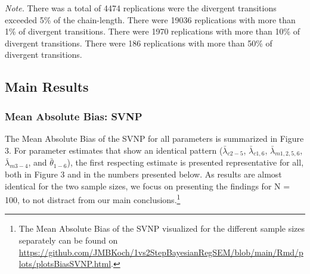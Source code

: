 \documentclass[
  english,
  man, donotrepeattitle,floatsintext]{apa6}
\begin{document}
\begin{table}[tbp]
\begin{center}
\begin{threeparttable}
\begin{tablenotes}[para]
\normalsize{\textit{Note.} There was a total of 4474 replications were the divergent transitions exceeded 5\% of the chain-length. There were 19036 replications with more than 1\% of divergent transitions. There were 1970 replications with more than 10\% of divergent transitions. There were 186 replications with more than 50\% of divergent transitions.}
\end{tablenotes}

\end{threeparttable}
\end{center}

\end{table}

\hypertarget{main-results}{%
\subsection{Main Results}\label{main-results}}

\hypertarget{mean-absolute-bias-svnp}{%
\subsubsection{Mean Absolute Bias: SVNP}\label{mean-absolute-bias-svnp}}

The Mean Absolute Bias of the SVNP for all parameters is summarized in Figure 3. For parameter estimates that show an identical pattern (\(\bar{\lambda}_{c 2-5}\), \(\bar{\lambda}_{c 1, 6}\), \(\bar{\lambda}_{m 1, 2, 5, 6}\), \(\bar{\lambda}_{m 3-4}\), and \(\bar{\theta}_{1-6}\)), the first respecting estimate is presented representative for all, both in Figure 3 and in the numbers presented below. As results are almost identical for the two sample sizes, we focus on presenting the findings for N = 100, to not distract from our main conclusions.\footnote{The Mean Absolute Bias of the SVNP visualized for the different sample sizes separately can be found on \url{https://github.com/JMBKoch/1vs2StepBayesianRegSEM/blob/main/Rmd/plots/plotsBiasSVNP.html}.}
\end{document}
